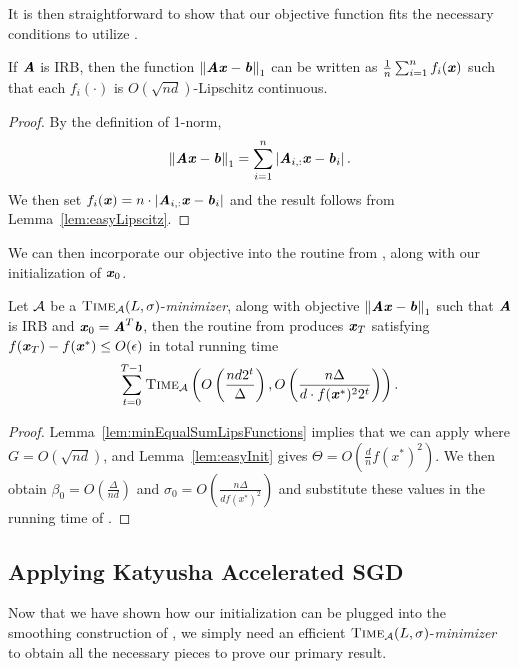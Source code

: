 It is then straightforward to show that our objective function fits the necessary conditions to utilize .


\begin{lemma}\label{lem:minEqualSumLipsFunctions}
	If $\AA$ is IRB, then the function $\norm{\AA\xx - \bb}_1$ can be written as $\frac{1}{n}\sum_{i=1}^n f_i(\xx)$ such that each $f_i(\cdot)$ is $O(\sqrt{nd})$-Lipschitz continuous.
\end{lemma}


\begin{proof}
	By the definition of 1-norm,
	\[\norm{\AA\xx - \bb}_1 = \sum_{i=1}^n\abs{\AA_{i,:}\xx-\bb_i}.\]
	We then set $f_i(\xx) = n \cdot \abs{\AA_{i,:}\xx-\bb_i}$ and the result follows from Lemma~\ref{lem:easyLipscitz}.
\end{proof}

We can then incorporate our objective into the routine from , along with our initialization of $\xx_0$.

\begin{lemma}\label{lem:applyReduction}
	Let $\calA$ be a $\textsc{Time}_\calA(L,\sigma)$-\textit{minimizer}, along with objective $\norm{\AA\xx -\bb}_1$ such that $\AA$ is IRB and $\xx_0 = \AA^T \bb$, then the routine from  produces
	$\xx_T$ satisfying $f(\xx_T) - f(\xx^*) \leq O(\epsilon)$ in total running time \[ \sum_{t=0}^{T-1}\textsc{Time}_\calA\left(O\left(\frac{nd2^t}{\Delta}\right),O\left(\frac{n\Delta}{d \cdot f(\xx^*)^2 2^t}\right)\right).\] 
\end{lemma}

\begin{proof}
	Lemma~\ref{lem:minEqualSumLipsFunctions} implies that we can apply  where $G = O(\sqrt{nd})$, and Lemma~\ref{lem:easyInit} gives $\Theta = O(\frac{d}{n}f(x^*)^2)$.
	We then obtain $\beta_0 = O(\frac{\Delta}{nd})$ and $\sigma_0 = O(\frac{n\Delta}{d f(x^*)^2})$ and substitute these values in the running time of .
\end{proof}

\subsection{Applying Katyusha Accelerated SGD}\label{subsec:applykatyusha}

Now that we have shown how our initialization can be plugged into the smoothing construction of \cite{AllenZhuH16}, we simply need an efficient $\textsc{Time}_\calA(L,\sigma)$-\textit{minimizer} to obtain all the necessary pieces to prove our primary result.

